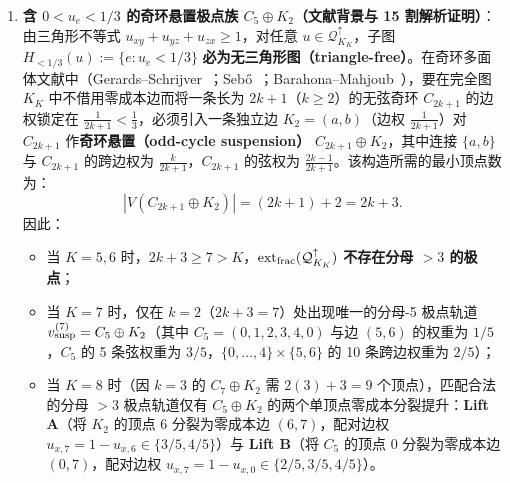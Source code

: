 \documentclass[11pt,a4paper]{ctexart}
\theoremstyle{definition}
\newcommand{\1}{\boldsymbol 1}
\newcommand{\0}{\boldsymbol 0}
\begin{document}
\begin{enumerate}[label=\textbf{类别 \Roman*:},leftmargin=*]
\item \textbf{含 $0<u_e<1/3$ 的奇环悬置极点族 $C_5\oplus K_2$（文献背景与 15 割解析证明）}：
由三角形不等式 $u_{xy}+u_{yz}+u_{zx}\ge 1$，对任意 $u\in\mathcal Q_{K_K}^{\uparrow}$，子图 $H_{<1/3}(u):=\{e:u_e<1/3\}$ \textbf{必为无三角形图（triangle-free）}。在奇环多面体文献中（Gerards--Schrijver~\cite{GerardsSchrijver1986}；Seb\H{o}~\cite{Sebo1995}；Barahona--Mahjoub~\cite{BarahonaMahjoub1986}），要在完全图 $K_K$ 中不借用零成本边而将一条长为 $2k+1$（$k\ge 2$）的无弦奇环 $C_{2k+1}$ 的边权锁定在 $\frac{1}{2k+1}<\frac{1}{3}$，必须引入一条独立边 $K_2=(a,b)$（边权 $\frac{1}{2k+1}$）对 $C_{2k+1}$ 作\textbf{奇环悬置（odd-cycle suspension）} $C_{2k+1}\oplus K_2$，其中连接 $\{a,b\}$ 与 $C_{2k+1}$ 的跨边权为 $\frac{k}{2k+1}$，$C_{2k+1}$ 的弦权为 $\frac{2k-1}{2k+1}$。该构造所需的最小顶点数为：
\[
 |V(C_{2k+1}\oplus K_2)| = (2k+1) + 2 = 2k + 3.
\]
因此：
\begin{itemize}
\item 当 $K=5,6$ 时，$2k+3\ge 7>K$，$\operatorname{ext}_{\rm frac}(\mathcal Q_{K_K}^{\uparrow})$ \textbf{不存在分母 $>3$ 的极点}；
\item 当 $K=7$ 时，仅在 $k=2$（$2k+3=7$）处出现唯一的分母-5 极点轨道 $v_{\rm susp}^{(7)}=C_5\oplus K_2$（其中 $C_5=(0,1,2,3,4,0)$ 与边 $(5,6)$ 的权重为 $1/5$，$C_5$ 的 5 条弦权重为 $3/5$，$\{0,\dots,4\}\times\{5,6\}$ 的 10 条跨边权重为 $2/5$）；
\item 当 $K=8$ 时（因 $k=3$ 的 $C_7\oplus K_2$ 需 $2(3)+3=9$ 个顶点），匹配合法的分母 $>3$ 极点轨道仅有 $C_5\oplus K_2$ 的两个单顶点零成本分裂提升：\textbf{Lift A}（将 $K_2$ 的顶点 $6$ 分裂为零成本边 $(6,7)$，配对边权 $u_{x,7}=1-u_{x,6}\in\{3/5,4/5\}$）与 \textbf{Lift B}（将 $C_5$ 的顶点 $0$ 分裂为零成本边 $(0,7)$，配对边权 $u_{x,7}=1-u_{x,0}\in\{2/5,3/5,4/5\}$）。
\end{itemize}
\end{enumerate}
\end{document}
